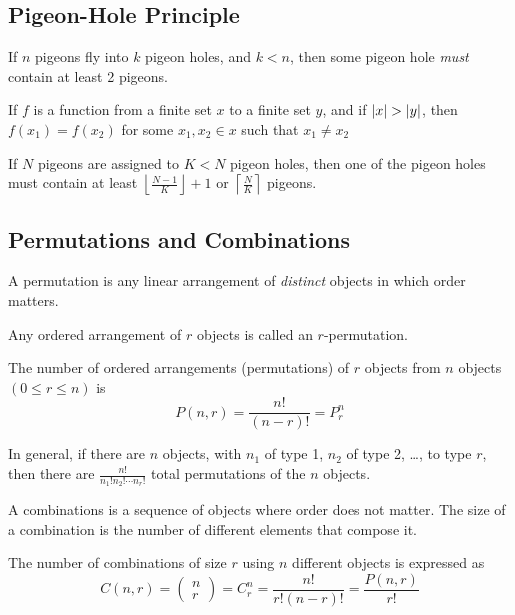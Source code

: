     \subsection{Pigeon-Hole Principle}
    \begin{thm}
        If $n$ pigeons fly into $k$ pigeon holes, and $k < n$, then some pigeon hole \textit{must} contain at least 2 pigeons.

        If $f$ is a function from a finite set $x$ to a finite set $y$, and if $\left\lvert x \right\rvert > \left\lvert y \right\rvert$, then $f(x_1) = f(x_2)$ for some $x_1, x_2 \in x$ such that $x_1 \neq x_2$
    \end{thm}

    \begin{thm}
        If $N$ pigeons are assigned to $K < N$ pigeon holes, then one of the pigeon holes must contain at least $\left \lfloor{\frac{N-1}{K} }\right \rfloor + 1$ or $\left \lceil{\frac{N}{K} }\right \rceil $ pigeons.
    \end{thm}

    \subsection{Permutations and Combinations}

    \begin{thm}[Permutations]
        A permutation is any linear arrangement of \textit{distinct} objects in which order matters.

        Any ordered arrangement of $r$ objects is called an $r$-permutation.

        The number of ordered arrangements (permutations) of $r$ objects from $n$ objects $(0 \le r \le n)$ is
            \[
                P(n, r) = \frac{n!}{(n - r)!} = P^n_r
            \]

        In general, if there are $n$ objects, with $n_1$ of type 1, $n_2$ of type 2, \ldots, to type $r$, then there are $\frac{n!}{n_1! n_2! \cdots n_r!}$ total permutations of the $n$ objects.
    \end{thm}

    \begin{thm}
        A combinations is a sequence of objects where order does not matter. The size of a combination is the number of different elements that compose it.

        The number of combinations of size $r$ using $n$ different objects is expressed as
            \[
                C(n, r) = \begin{pmatrix}n\\r\end{pmatrix} = C^n_r = \frac{n!}{r!(n - r)!} = \frac{P(n, r)}{r!}
            \]
    \end{thm}

